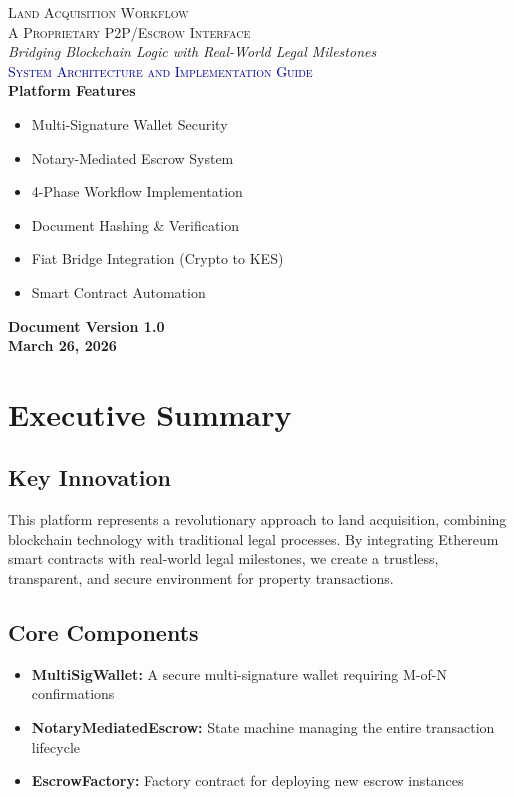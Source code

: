 \documentclass[12pt,a4paper]{article}
\begin{document}
\begin{titlepage}
\vspace*{0.5in}
\begin{center}
\textcolor{sectionblue}{\Large\scshape Land Acquisition Workflow}\\[0.3in]

\textsc{\Large A Proprietary P2P/Escrow Interface}\\[0.2in]
\textit{Bridging Blockchain Logic with Real-World Legal Milestones}\\[0.5in]

\textcolor{darkblue}{\Large\scshape System Architecture and Implementation Guide}\\[1in]

\textbf{Platform Features}
\begin{itemize}
\item Multi-Signature Wallet Security
\item Notary-Mediated Escrow System
\item 4-Phase Workflow Implementation
\item Document Hashing \& Verification
\item Fiat Bridge Integration (Crypto to KES)
\item Smart Contract Automation
\end{itemize}

\vfill
\textbf{Document Version 1.0}\\
\textbf{March 26, 2026}
\end{center}
\end{titlepage}

\newpage

\section{Executive Summary}

\subsection{Key Innovation}
This platform represents a revolutionary approach to land acquisition, combining blockchain technology with traditional legal processes. By integrating Ethereum smart contracts with real-world legal milestones, we create a trustless, transparent, and secure environment for property transactions.

\subsection{Core Components}
\begin{itemize}
\item \textbf{MultiSigWallet:} A secure multi-signature wallet requiring M-of-N confirmations
\item \textbf{NotaryMediatedEscrow:} State machine managing the entire transaction lifecycle
\item \textbf{EscrowFactory:} Factory contract for deploying new escrow instances
\end{itemize}
\end{document}
